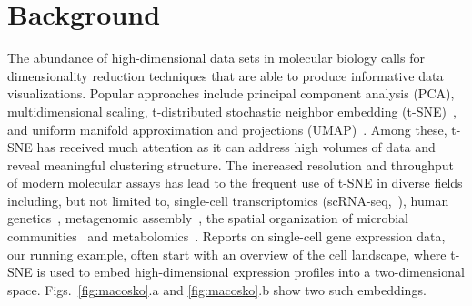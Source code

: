 \documentclass[twocolumn]{bmcart}
\begin{document}
\section*{Background}

The abundance of high-dimensional data sets in molecular biology calls for
dimensionality reduction techniques that are able to produce
informative data visualizations. Popular approaches include principal component
analysis (PCA), multidimensional scaling, t-distributed stochastic neighbor
embedding (t-SNE)~\cite{maaten2008visualizing}, and uniform manifold
approximation and projections (UMAP)~\cite{2018arXivUMAP}. Among these, t-SNE has
received much attention as it can address high volumes of data and reveal
meaningful clustering structure. The increased resolution and throughput of modern
molecular assays has lead to the frequent use of t-SNE in diverse fields
including, but not limited to, single-cell
transcriptomics (scRNA-seq,~\cite{macosko2015highly,cao2019single,tasic2018shared}),
human genetics~\cite{hirata2019genetic}, metagenomic
assembly~\cite{beaulaurier2018metagenomic}, the spatial organization of
microbial communities~\cite{sheth2019spatial} and
metabolomics~\cite{tkachev2019differences}. Reports on single-cell gene
expression data, our running example, often start with an overview of the cell
landscape, where t-SNE is used to embed high-dimensional expression profiles into a
two-dimensional space. Figs.~\ref{fig:macosko}.a and \ref{fig:macosko}.b show
two such embeddings.
\end{document}
